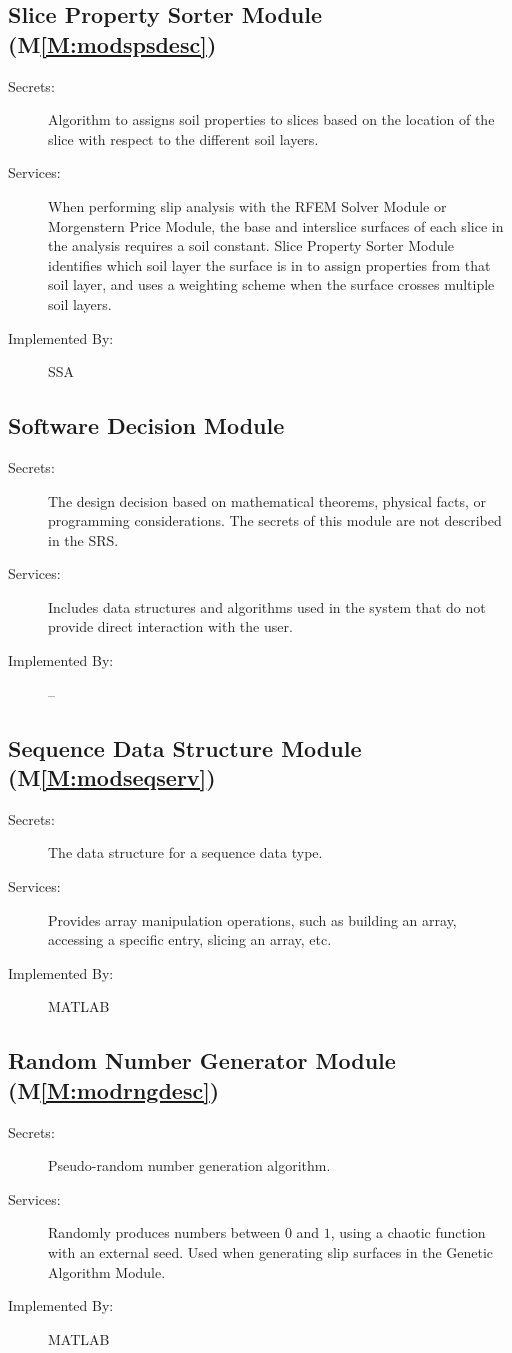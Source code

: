 \documentclass[12pt]{article}
\begin{document}
\subsection{Slice Property Sorter Module (M\ref{M:modspsdesc})}
\label{Sec:SlicPropSortModu()}
\begin{description}
\item[Secrets:]Algorithm to assigns soil properties to slices based on the location of the slice with respect to the different soil layers.
\item[Services:]When performing slip analysis with the RFEM Solver Module or Morgenstern Price Module, the base and interslice surfaces of each slice in the analysis requires a soil constant. Slice Property Sorter Module identifies which soil layer the surface is in to assign properties from that soil layer, and uses a weighting scheme when the surface crosses multiple soil layers.
\item[Implemented By:]SSA
\end{description}
\subsection{Software Decision Module}
\label{Sec:SoftDeciModu}
\begin{description}
\item[Secrets:]The design decision based on mathematical theorems, physical facts, or programming considerations. The secrets of this module are not described in the SRS.
\item[Services:]Includes data structures and algorithms used in the system that do not provide direct interaction with the user.
\item[Implemented By:]--
\end{description}
\subsection{Sequence Data Structure Module (M\ref{M:modseqserv})}
\label{Sec:SequDataStruModu()}
\begin{description}
\item[Secrets:]The data structure for a sequence data type.
\item[Services:]Provides array manipulation operations, such as building an array, accessing a specific entry, slicing an array, etc.
\item[Implemented By:]MATLAB
\end{description}
\subsection{Random Number Generator Module (M\ref{M:modrngdesc})}
\label{Sec:RandNumbGeneModu()}
\begin{description}
\item[Secrets:]Pseudo-random number generation algorithm.
\item[Services:]Randomly produces numbers between $0$ and $1$, using a chaotic function with an external seed. Used when generating slip surfaces in the Genetic Algorithm Module.
\item[Implemented By:]MATLAB
\end{description}
\end{document}
